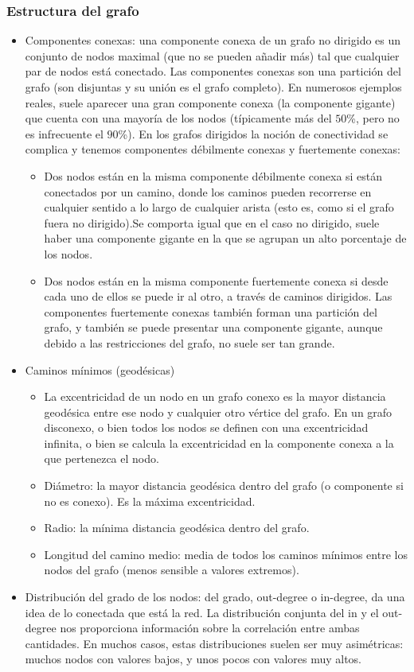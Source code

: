 \subsubsection{Estructura del grafo}
\label{sect:estructura_grafo}
\begin{itemize}
\item Componentes conexas: una componente conexa de un grafo no dirigido es
un conjunto de nodos maximal (que no se pueden añadir más) tal que cualquier par de nodos
está conectado. Las componentes conexas son una partición del grafo (son disjuntas y
su unión es el grafo completo). En numerosos ejemplos reales, suele aparecer una gran
componente conexa (la componente gigante) que cuenta con una mayoría de los nodos (típicamente
más del $50$\%, pero no es infrecuente el $90$\%).  En los grafos dirigidos la noción de 
conectividad se complica y tenemos componentes débilmente conexas y fuertemente conexas:
	\begin{itemize}
	\item Dos nodos están en la misma componente débilmente conexa si están conectados por un camino,
	donde los caminos pueden recorrerse en cualquier sentido a lo largo de cualquier arista (esto es,
	como si el grafo fuera no dirigido).Se comporta igual que en el caso no dirigido, suele haber una
	componente gigante en la que se agrupan un alto porcentaje de los nodos.
	\item Dos nodos están en la misma componente fuertemente conexa si desde cada uno de ellos se puede
	ir al otro, a través de caminos dirigidos. Las componentes fuertemente conexas también
	forman una partición del grafo, y también se puede presentar una componente gigante,
	aunque debido a las restricciones del grafo, no suele ser tan grande. 
	\end{itemize}

\item Caminos mínimos (geodésicas)
	\begin{itemize}
	\item La excentricidad de un nodo en un grafo conexo es la mayor distancia
	geodésica entre ese nodo y cualquier otro vértice del grafo. En un grafo disconexo,
	o bien todos los nodos se definen con una excentricidad infinita, o bien se calcula 
	la excentricidad en la componente conexa a la que pertenezca el nodo. 
	\item Diámetro: la mayor distancia geodésica dentro del grafo (o componente si no es conexo). 
	Es la máxima excentricidad.
	\item Radio: la mínima distancia geodésica dentro del grafo.
	\item Longitud del camino medio: media de todos los caminos mínimos entre los 
	nodos del grafo (menos sensible a valores extremos).
	\end{itemize}
\item Distribución del grado de los nodos: del grado, out-degree o in-degree, da una idea
de lo conectada que está la red. La distribución conjunta del in y el out-degree
nos proporciona información sobre la correlación entre ambas cantidades. En muchos casos,
estas distribuciones suelen ser muy asimétricas: muchos nodos con valores bajos, y unos pocos
con valores muy altos.


\end{itemize}
